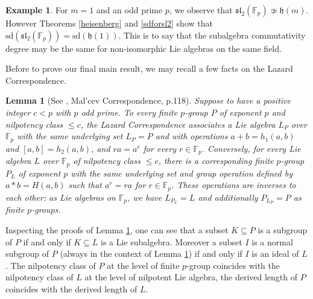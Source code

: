 \documentclass{amsart}
\newtheorem{lemma}[theorem]{Lemma}
\theoremstyle{definition}
\newtheorem{example}[theorem]{Example}
\numberwithin{equation}{section}
\begin{document}
\begin{example}For $m=1$ and an odd prime $p$, we  observe that $\mathfrak{sl}_2(\mathbb{F}_{p}) \not\simeq \mathfrak{h}(m) $.  However Theorems \ref{heisenberg} and  \ref{sdforsl2} show that $\mathrm{sd}(\mathfrak{sl}_2(\mathbb{F}_{p}))=\mathrm{sd}(\mathfrak{h}(1))$. This is to say that the subalgebra commutativity degree may be the same for non-isomorphic Lie algebras on the same field.
\end{example}



 




Before to prove our final main result, we may recall a few facts on the Lazard Correspondence.

\begin{lemma}[See \cite{Khukhro1998}, Mal'cev Correspondence, p.118]  \label{lazard1} Suppose to have a positive integer $c<p$ with $p$ odd prime. To every finite $p$-group $P$ of exponent $p$ and nilpotency class $\leq c$, the Lazard Correspondence associates a Lie algebra $L_P$ over $\mathbb{F}_p$ with the same underlying set $L_P=P$ and with operations $a+b=h_1(a, b)$ and $[a, b]=h_2(a, b)$, and $r a=a^r$ for every $r \in \mathbb{F}_p$. Conversely, for every Lie algebra $L$ over $\mathbb{F}_p$ of nilpotency class $\leq c$, there is a corresponding finite $p$-group $P_L$ of exponent $p$ with the same underlying set and group operation defined by $a * b=H(a, b)$ such that $a^r=r a$ for $r \in \mathbb{F}_p$. These operations are inverses to each other: as Lie algebras on $\mathbb{F}_p$, we have $L_{P_L}=L$ and additionally $P_{L_P}=P$ as finite $p$-groups.
\end{lemma}

Inspecting the proofs of Lemma \ref{lazard1}, one can see that a subset $ K \subseteq P$ is a subgroup of $P$ if and only if $ K \subseteq L$ is a Lie subalgebra. Moreover a subset $I$ is a normal subgroup of $P$ (always in the context of Lemma \ref{lazard1}) if and only if $I$ is an ideal of $L$. The nilpotency class of $P$ at the level of finite $p$-group coincides with the nilpotency class of $L$ at the level of nilpotent Lie algebra, the derived length of $P$ coincides with the derived length of $L$.
\end{document}

